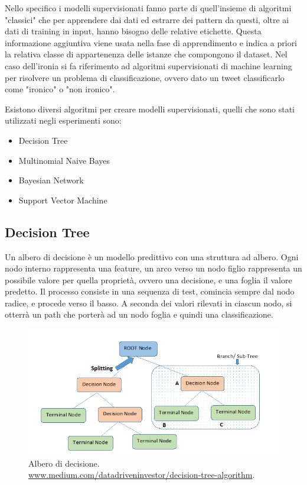 \documentclass[oneside]{book}
\begin{document}
Nello specifico i modelli supervisionati fanno parte di quell'insieme di algoritmi "classici" che per apprendere dai dati ed estrarre dei pattern da questi, oltre ai dati di training in input, hanno bisogno delle relative etichette. Questa informazione aggiuntiva viene usata nella fase di apprendimento e indica a priori la relativa classe di appartenenza delle istanze che compongono il dataset. Nel caso dell'ironia si fa riferimento ad algoritmi supervisionati di machine learning per risolvere un problema di classificazione, ovvero dato un tweet classificarlo come "ironico" o "non ironico".

Esistono diversi algoritmi per creare modelli supervisionati, quelli che sono stati utilizzati negli esperimenti sono:
\begin{itemize}
	\item Decision Tree
	\item Multinomial Naive Bayes
	\item Bayesian Network
	\item Support Vector Machine
\end{itemize}

\subsection{Decision Tree}
Un albero di decisione è un modello predittivo con una struttura ad albero. Ogni nodo interno rappresenta una feature, un arco verso un nodo figlio rappresenta un possibile valore per quella proprietà, ovvero una decisione, e una foglia il valore predetto. Il processo consiste in una sequenza di test, comincia sempre dal nodo radice, e procede verso il basso. A seconda dei valori rilevati in ciascun nodo, si otterrà un path che porterà ad un nodo foglia e quindi una classificazione.

\begin{figure}[!h]
	\centering
	\includegraphics[width=13cm]{assets/decision_tree.png}
	\caption{Albero di decisione. \\ \url{www.medium.com/datadriveninvestor/decision-tree-algorithm}.}
	\label{fig:decision-tree}
\end{figure}
\end{document}
